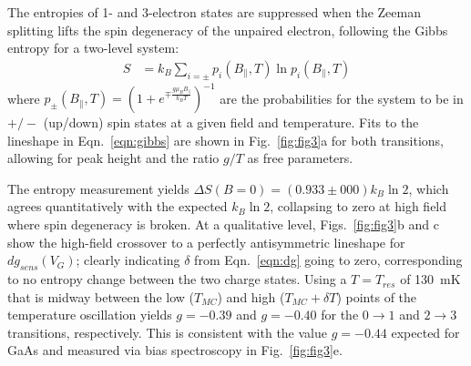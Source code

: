 \documentclass[twocolumn,showpacs,preprintnumbers,amsmath,amssymb,pra,aps,superscriptaddress]{revtex4-1}
\begin{document}
The entropies of 1- and 3-electron states are suppressed when the Zeeman splitting lifts the spin degeneracy of the unpaired electron, following the Gibbs entropy for a two-level system:
%
\begin{align}
\label{eqn:gibbs}
        S &= k_B \sum_{i=\pm} p_{i}(B_\parallel, T) \ln{ p_{i}(B_\parallel,T) }
\end{align}
%
where $p_{\pm}(B_\parallel, T) = (1+ e^{\mp \frac{g\mu_B B_{\parallel}}{k_B T}})^{-1}$ are the probabilities for the system to be in $+/-$ (up/down) spin states at a given field and temperature. Fits to the lineshape in Eqn.~\ref{eqn:gibbs} are shown in Fig.~\ref{fig:fig3}a for both transitions, allowing for peak height and the ratio $g/T$ as free parameters.

The entropy measurement yields $\Delta S(B=0) = (0.933 \pm 000) k_B \ln{2}$, which agrees quantitatively with the expected $k_{B} \ln{2}$, collapsing to zero at high field where spin degeneracy is broken.  At a qualitative level, Figs.~\ref{fig:fig3}b and c show the high-field crossover to a perfectly antisymmetric lineshape for $dg_{sens}(V_G)$; clearly indicating $\delta$ from Eqn.~\ref{eqn:dg} going to zero, corresponding to no entropy change between the two charge states. Using a $T=T_{res}$ of \SI{130}{\milli\kelvin} that is midway between the low ($T_{MC}$) and high ($T_{MC}+\delta T$) points of the temperature oscillation yields $g=-0.39$ and $g=-0.40$ for the $0\rightarrow 1$ and $2\rightarrow 3$ transitions, respectively. This is consistent with the value $g=-0.44$ expected for GaAs and measured via bias spectroscopy in Fig.~\ref{fig:fig3}e.
\end{document}
